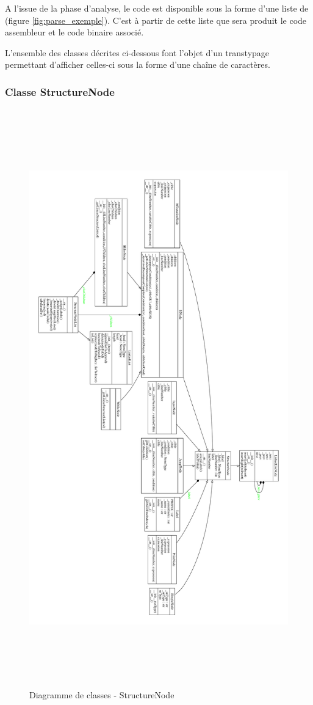 A l'issue de la phase d'analyse, le code est disponible sous la forme d'une liste de  (figure \ref{fig:parse_exemple}). C'est à partir de cette liste que sera produit le code assembleur et le code binaire associé.

L'ensemble des classes décrites ci-dessous font l'objet d'un transtypage permettant d'afficher celles-ci sous la forme d'une chaîne de caractères. 

\subsubsection{Classe StructureNode}

\begin{figure}[h!]
	\centering
	\includegraphics[height=25cm]{./Pictures/StructureNode.pdf}
	\caption{\label{fig:class_StructureNode}Diagramme de classes - StructureNode}
\end{figure}

